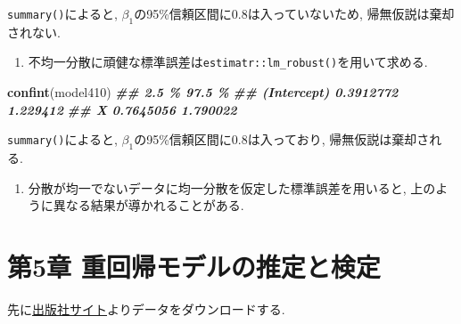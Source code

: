 \documentclass[
]{book}
\newenvironment{Shaded}{\begin{snugshade}}{\end{snugshade}}
\newcommand{\DocumentationTok}[1]{\textcolor[rgb]{0.56,0.35,0.01}{\textbf{\textit{#1}}}}
\newcommand{\FunctionTok}[1]{\textcolor[rgb]{0.13,0.29,0.53}{\textbf{#1}}}
\newcommand{\NormalTok}[1]{#1}
\providecommand{\tightlist}{%
  \setlength{\itemsep}{0pt}\setlength{\parskip}{0pt}}
\begin{document}
\texttt{summary()}によると, \(\beta_1\)の95\%信頼区間に0.8は入っていないため, 帰無仮説は棄却されない.

\begin{enumerate}
\def\labelenumi{(\arabic{enumi})}
\setcounter{enumi}{3}
\tightlist
\item
  不均一分散に頑健な標準誤差は\texttt{estimatr::lm\_robust()}を用いて求める.
\end{enumerate}

\begin{Shaded}
\begin{Highlighting}[]
\FunctionTok{confint}\NormalTok{(model410)}
\DocumentationTok{\#\#                 2.5 \%   97.5 \%}
\DocumentationTok{\#\# (Intercept) 0.3912772 1.229412}
\DocumentationTok{\#\# X           0.7645056 1.790022}
\end{Highlighting}
\end{Shaded}

\texttt{summary()}によると, \(\beta_1\)の95\%信頼区間に0.8は入っており, 帰無仮説は棄却される.

\begin{enumerate}
\def\labelenumi{(\arabic{enumi})}
\setcounter{enumi}{4}
\tightlist
\item
  分散が均一でないデータに均一分散を仮定した標準誤差を用いると, 上のように異なる結果が導かれることがある.
\end{enumerate}

\hypertarget{ch5}{%
\chapter*{第5章 重回帰モデルの推定と検定}\label{ch5}}

先に\href{https://www.yuhikaku.co.jp/books/detail/9784641053854}{出版社サイト}よりデータをダウンロードする.
\end{document}
